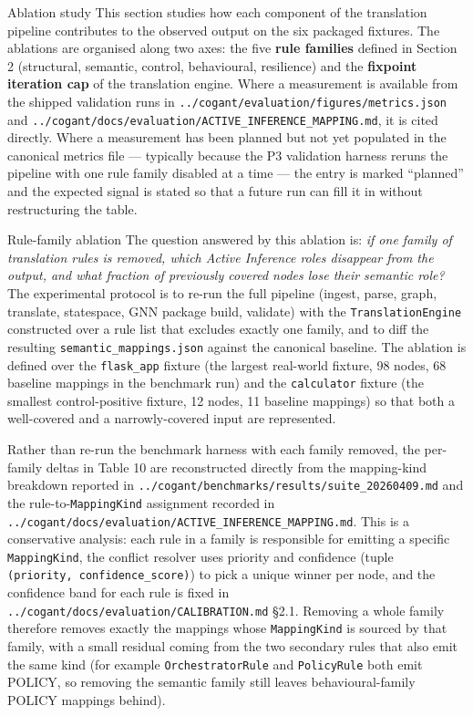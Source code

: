 \documentclass[
  ignorenonframetext,
]{beamer}
\author{\texorpdfstring{}{}}
\date{}
\begin{document}
\begin{frame}[fragile]{Ablation study}
\protect{}\label{ablation-study}
This section studies how each component of the translation pipeline
contributes to the observed output on the six packaged fixtures. The
ablations are organised along two axes: the five \textbf{rule families}
defined in Section 2 (structural, semantic, control, behavioural,
resilience) and the \textbf{fixpoint iteration cap} of the translation
engine. Where a measurement is available from the shipped validation
runs in \texttt{../cogant/evaluation/figures/metrics.json} and
\texttt{../cogant/docs/evaluation/ACTIVE\_INFERENCE\_MAPPING.md}, it is
cited directly. Where a measurement has been planned but not yet
populated in the canonical metrics file --- typically because the P3
validation harness reruns the pipeline with one rule family disabled at
a time --- the entry is marked ``planned'' and the expected signal is
stated so that a future run can fill it in without restructuring the
table.

\begin{block}{Rule-family ablation}
\protect{}\label{rule-family-ablation}
The question answered by this ablation is: \emph{if one family of
translation rules is removed, which Active Inference roles disappear
from the output, and what fraction of previously covered nodes lose
their semantic role?} The experimental protocol is to re-run the full
pipeline (ingest, parse, graph, translate, statespace, GNN package
build, validate) with the \texttt{TranslationEngine} constructed over a
rule list that excludes exactly one family, and to diff the resulting
\texttt{semantic\_mappings.json} against the canonical baseline. The
ablation is defined over the \texttt{flask\_app} fixture (the largest
real-world fixture, 98 nodes, 68 baseline mappings in the benchmark run)
and the \texttt{calculator} fixture (the smallest control-positive
fixture, 12 nodes, 11 baseline mappings) so that both a well-covered and
a narrowly-covered input are represented.

Rather than re-run the benchmark harness with each family removed, the
per-family deltas in Table 10 are reconstructed directly from the
mapping-kind breakdown reported in
\texttt{../cogant/benchmarks/results/suite\_20260409.md} and the
rule-to-\texttt{MappingKind} assignment recorded in
\texttt{../cogant/docs/evaluation/ACTIVE\_INFERENCE\_MAPPING.md}. This
is a conservative analysis: each rule in a family is responsible for
emitting a specific \texttt{MappingKind}, the conflict resolver uses
priority and confidence (tuple \texttt{(priority,\ confidence\_score)})
to pick a unique winner per node, and the confidence band for each rule
is fixed in \texttt{../cogant/docs/evaluation/CALIBRATION.md} §2.1.
Removing a whole family therefore removes exactly the mappings whose
\texttt{MappingKind} is sourced by that family, with a small residual
coming from the two secondary rules that also emit the same kind (for
example \texttt{OrchestratorRule} and \texttt{PolicyRule} both emit
POLICY, so removing the semantic family still leaves behavioural-family
POLICY mappings behind).


\end{block}
\end{frame}
\end{document}
